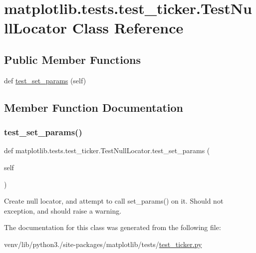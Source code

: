 \hypertarget{classmatplotlib_1_1tests_1_1test__ticker_1_1TestNullLocator}{}\section{matplotlib.\+tests.\+test\+\_\+ticker.\+Test\+Null\+Locator Class Reference}
\label{classmatplotlib_1_1tests_1_1test__ticker_1_1TestNullLocator}
\subsection*{Public Member Functions}
\begin{DoxyCompactItemize}
\item 
def \hyperlink{classmatplotlib_1_1tests_1_1test__ticker_1_1TestNullLocator_aa30a5484300433bf5db54f43da403981}{test\+\_\+set\+\_\+params} (self)
\end{DoxyCompactItemize}


\subsection{Member Function Documentation}
\mbox{\label{classmatplotlib_1_1tests_1_1test__ticker_1_1TestNullLocator_aa30a5484300433bf5db54f43da403981}} 
\subsubsection{\texorpdfstring{test\+\_\+set\+\_\+params()}{test\_set\_params()}}
{\footnotesize\ttfamily def matplotlib.\+tests.\+test\+\_\+ticker.\+Test\+Null\+Locator.\+test\+\_\+set\+\_\+params (\begin{DoxyParamCaption}\item[{}]{self }\end{DoxyParamCaption})}

\begin{DoxyVerb}Create null locator, and attempt to call set_params() on it.
Should not exception, and should raise a warning.
\end{DoxyVerb}
 

The documentation for this class was generated from the following file\+:\begin{DoxyCompactItemize}
\item 
venv/lib/python3./site-\/packages/matplotlib/tests/\hyperlink{test__ticker_8py}{test\+\_\+ticker.\+py}\end{DoxyCompactItemize}
